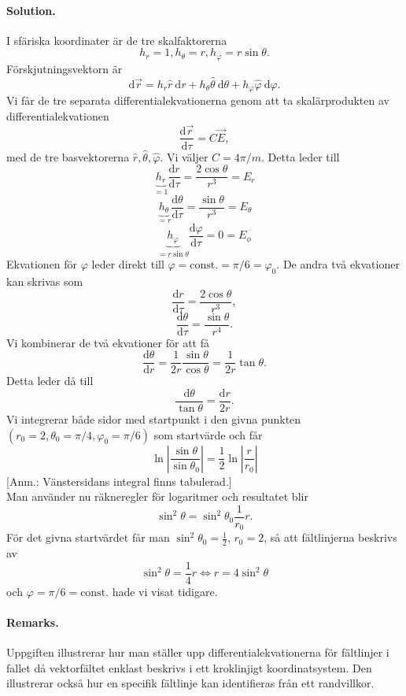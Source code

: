 \documentclass[%
oneside,                 %
final,                   %
10pt]{article}
\newenvironment{doconceexercise}{}{}
\begin{document}
\begin{doconceexercise}


\paragraph{Solution.}
I sfäriska koordinater är de tre skalfaktorerna
$$
h_r = 1, h_\theta = r, h_\varphi = r \sin \theta.
$$
Förskjutningsvektorn är
$$
\mbox{d}\vec{r} = h_r \hat{r}~\mbox{d}r + h_\theta \hat{\theta} ~\mbox{d}\theta + h_\varphi \hat{\varphi} ~ \mbox{d}\varphi.
$$
Vi får de tre separata differentialekvationerna genom att ta skalärprodukten av differentialekvationen
$$ \frac{\mbox{d}\vec{r} }{ \mbox{d}\tau} = C \vec{E},$$
med de tre basvektorerna $\hat{r}, \hat{\theta}, \hat{\varphi}$. Vi väljer $ C = 4\pi/m$. Detta leder till
$$ \underbrace{h_r}_{=1} \frac{\mbox{d}r}{\mbox{d}\tau} = \frac{2 \cos \theta}{r^3}  = E_r$$
$$  \underbrace{h_\theta}_{= r } \frac{\mbox{d}\theta}{\mbox{d}\tau} = \frac{\sin \theta }{r^3} = E_\theta$$
$$ \underbrace{h_\varphi}_{=r \sin \theta} \frac{\mbox{d} \varphi}{\mbox{d}\tau} = 0 = E_\phi$$
Ekvationen för $\varphi$ leder direkt till $\varphi = \mbox{const.} = \pi/6 = \varphi_0 $. De andra två ekvationer kan skrivas som
$$ \frac{\mbox{d}r}{\mbox{d}\tau} = \frac{2 \cos \theta}{ r^3}, $$
$$ \frac{\mbox{d}\theta}{\mbox{d}\tau} = \frac{\sin \theta}{ r^4}.$$
Vi kombinerar de två ekvationer för att få
$$ \frac{\mbox{d}\theta}{ \mbox{d} r} = \frac{1}{2r} \frac{\sin \theta}{\cos \theta} = \frac{1}{2r} \tan\theta.$$
Detta leder då till 
$$ \frac{\mbox{d}\theta}{\tan \theta} = \frac{\mbox{d}r}{2r}.$$
Vi integrerar både sidor med startpunkt i den givna punkten $(r_0 = 2, \theta_0 = \pi/4, \varphi_0=\pi/6)$ som startvärde och får
$$ \ln \left| \frac{\sin\theta}{\sin \theta_0} \right| = \frac{1}{2} \ln \left| \frac{r}{r_0} \right|$$
[Anm.: Vänstersidans integral finns tabulerad.] 
\\Man använder nu räkneregler för logaritmer och resultatet blir 
$$ \sin^2 \theta = \sin^2 \theta_0 \frac{1}{r_0} r.$$ För det givna startvärdet får man $\sin^2 \theta_0 = \frac{1}{2}$, $r_0 = 2$, så att fältlinjerna beskrivs av
$$ \sin^2 \theta = \frac{1}{4} r \Leftrightarrow r = 4 \sin^2 \theta$$ och $\varphi = \pi/6 = \mbox{const.}$ hade vi visat tidigare.



\paragraph{Remarks.}
Uppgiften illustrerar hur man ställer upp differentialekvationerna för fältlinjer i fallet då vektorfältet enklast beskrivs i ett kroklinjigt koordinatsystem. Den illustrerar också hur en specifik fältlinje kan identifieras från ett randvillkor.


\end{doconceexercise}



\end{document}
